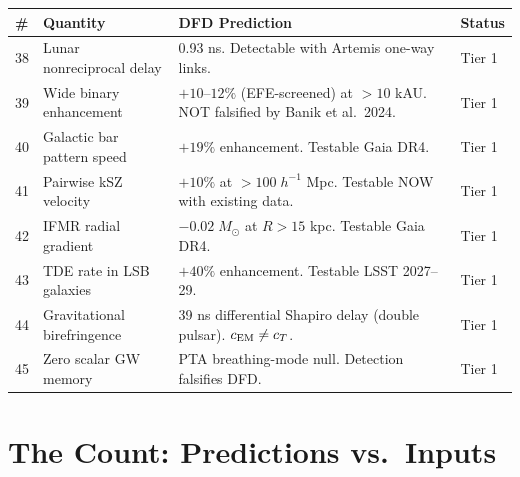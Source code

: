 \documentclass[12pt,a4paper]{article}
\begin{document}
\begin{longtable}{p{0.5cm}p{4cm}p{6.5cm}p{2.5cm}}
\toprule
\# & \textbf{Quantity} & \textbf{DFD Prediction} & \textbf{Status} \\
\midrule
\endhead
38 & Lunar nonreciprocal delay &
  0.93 ns.  Detectable with Artemis one-way links. &
  Tier 1 \\[4pt]

39 & Wide binary enhancement &
  $+10$--$12\%$ (EFE-screened) at $>10$ kAU.
  NOT falsified by Banik et al.\ 2024. &
  Tier 1 \\[4pt]

40 & Galactic bar pattern speed &
  $+19\%$ enhancement.  Testable Gaia DR4. &
  Tier 1 \\[4pt]

41 & Pairwise kSZ velocity &
  $+10\%$ at $>100\;h^{-1}$ Mpc.
  Testable NOW with existing data. &
  Tier 1 \\[4pt]

42 & IFMR radial gradient &
  $-0.02\;M_\odot$ at $R > 15$ kpc.  Testable Gaia DR4. &
  Tier 1 \\[4pt]

43 & TDE rate in LSB galaxies &
  $+40\%$ enhancement.  Testable LSST 2027--29. &
  Tier 1 \\[4pt]

44 & Gravitational birefringence &
  39 ns differential Shapiro delay (double pulsar).
  $c_{\rm EM} \neq c_T$. &
  Tier 1 \\[4pt]

45 & Zero scalar GW memory &
  PTA breathing-mode null.  Detection falsifies DFD. &
  Tier 1 \\[4pt]

\bottomrule
\end{longtable}

\section{The Count: Predictions vs.\ Inputs}
\label{sec:count}
\end{document}
